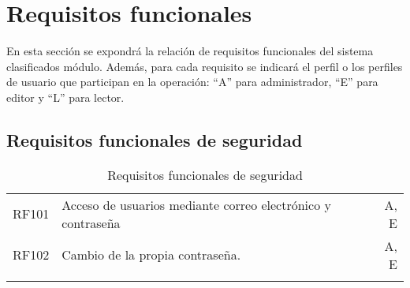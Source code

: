\section{Requisitos funcionales}\label{requisitos-funcionales}
En esta sección se expondrá la relación de requisitos funcionales del sistema clasificados módulo. Además, para cada requisito se indicará el perfil o los perfiles de usuario que participan en la operación: ``A'' para administrador, ``E'' para editor y ``L'' para lector.


\renewcommand{\arraystretch}{1.5} %

\subsection{Requisitos funcionales de seguridad}
\label{cuadro:requisitos-funcionales-de-seguridad}
\begin{longtable}{l|p{13cm}|r}
  RF101\label{RF101} & Acceso de usuarios mediante correo electrónico y contraseña & A, E \\
  RF102\label{RF102} & Cambio de la propia contraseña. & A, E \\
  \caption{Requisitos funcionales de seguridad} \\
\end{longtable}

